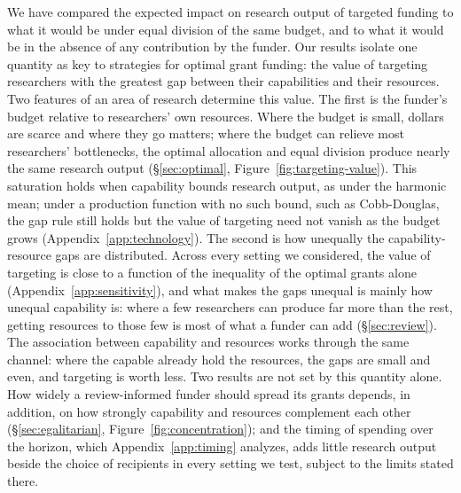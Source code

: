 \documentclass[article, 11pt, reqno]{amsart}
\theoremstyle{named}
\begin{document}
We have compared the expected impact on research output of targeted funding to what it would be under equal division of the same budget, and to what it would be in the absence of any contribution by the funder. Our results isolate one quantity as key to strategies for optimal grant funding: the value of targeting researchers with the greatest gap between their capabilities and their resources. Two features of an area of research determine this value. The first is the funder's budget relative to researchers' own resources. Where the budget is small, dollars are scarce and where they go matters; where the budget can relieve most researchers' bottlenecks, the optimal allocation and equal division produce nearly the same research output (\S\ref{sec:optimal}, Figure~\ref{fig:targeting-value}). This saturation holds when capability bounds research output, as under the harmonic mean; under a production function with no such bound, such as Cobb-Douglas, the gap rule still holds but the value of targeting need not vanish as the budget grows (Appendix~\ref{app:technology}). The second is how unequally the capability-resource gaps are distributed. Across every setting we considered, the value of targeting is close to a function of the inequality of the optimal grants alone (Appendix~\ref{app:sensitivity}), and what makes the gaps unequal is mainly how unequal capability is: where a few researchers can produce far more than the rest, getting resources to those few is most of what a funder can add (\S\ref{sec:review}). The association between capability and resources works through the same channel: where the capable already hold the resources, the gaps are small and even, and targeting is worth less. Two results are not set by this quantity alone. How widely a review-informed funder should spread its grants depends, in addition, on how strongly capability and resources complement each other (\S\ref{sec:egalitarian}, Figure~\ref{fig:concentration}); and the timing of spending over the horizon, which Appendix~\ref{app:timing} analyzes, adds little research output beside the choice of recipients in every setting we test, subject to the limits stated there.
\end{document}
